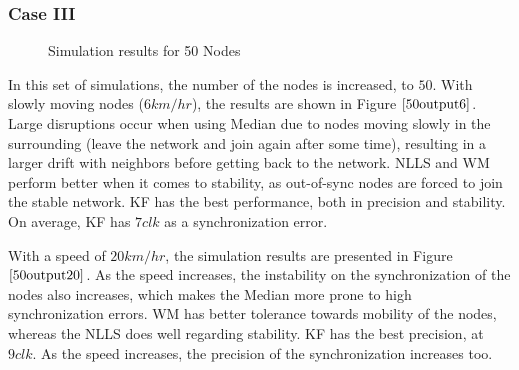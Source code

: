 \documentclass[journal]{IEEEtran}
\begin{document}
\subsubsection{\textbf{Case III}}
\begin{figure}
\centerline{  \hfil {}} \caption{Simulation results for 50 Nodes}
\label{50output}
\end{figure}
In this set of simulations, the number of the nodes is increased, to
$50$. With slowly moving nodes ($6km/hr$), the results are shown in
Figure $\ref{50output6}$. Large disruptions occur when using Median
due to nodes moving slowly in the surrounding (leave the network and
join again after some time), resulting in a larger drift with
neighbors before getting back to the network. NLLS and WM perform
better when it comes to stability, as out-of-sync nodes are forced
to join the stable network. KF has the best performance, both in
precision and stability. On average, KF has $7clk$ as a
synchronization error.
\par
With a speed of $20km/hr$, the simulation results are presented in Figure $\ref{50output20}$. As the speed increases, the instability
on the synchronization of the nodes also increases, which makes the Median more prone to high synchronization errors. WM has better
tolerance towards mobility of the nodes, whereas the NLLS does well regarding stability. KF has the best precision, at $9clk$. As the
speed increases, the precision of the synchronization increases too.
\end{document}
